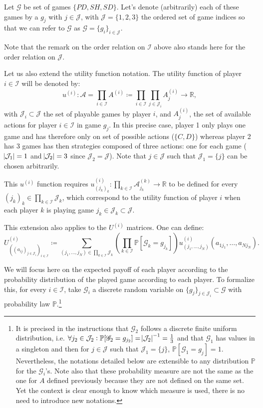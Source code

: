 \documentclass{article}
\renewcommand{\P}{\mathbb P}
\newcommand{\R}{\mathbb R}
\begin{document}
Let $\mathcal G$ be set of games $\{PD, SH, SD\}$. Let's denote (arbitrarily) each of these games by a $g_j$
with $j \in \mathcal J$, with $\mathcal J = \{1, 2, 3\}$ the ordered set of game indices so that we can refer
to $\mathcal G$ as $\mathcal G = \{g_i\}_{i \in \mathcal J}$.

Note that the remark on the order relation on $\mathcal I$ above also stands here for the order relation
on $\mathcal J$.

Let us also extend the utility function notation. The utility function of player $i \in \mathcal I$
will be denoted by:
\[u^{(i)} : \mathcal A = \prod_{i \in \mathcal I}A^{(i)} \coloneqq
	\prod_{i \in \mathcal I}\prod_{j \in \mathcal J_i}A^{(i)}_j \to \R,\]
with $\mathcal J_i \subset \mathcal J$ the set of playable games by player $i$, and $A^{(i)}_j$, the set of
available actions for player $i \in \mathcal I$ in game $g_j$. In this precise case, player 1 only plays
one game and has therefore only on set of possible actions ($\{C, D\}$) whereas player 2 has 3 games has
then strategies composed of three actions: one for each game ($\abs {\mathcal J_1} = 1$ and
$\abs {\mathcal J_2} = 3$ since $\mathcal J_2 = \mathcal J$). Note that $j \in \mathcal J$ such that
$\mathcal J_1 = \{j\}$ can be chosen arbitrarily.

This $u^{(i)}$ function requires $u^{(i)}_{(j_k)_k} : \prod_{k \in \mathcal I}\mathcal A^{(k)}_{j_k} \to \R$
to be defined for every $(j_k)_k \in \prod_{k \in \mathcal I}\mathcal J_k$, which correspond to the
utility function of player $i$ when each player $k$ is playing game $j_k \in \mathcal J_k \subset \mathcal J$.

This extension also applies to the $U^{(i)}$ matrices. One can define:
\[U^{(i)}_{((a_{ij})_{j \in \mathcal J_i})_{i \in \mathcal I}} \coloneqq
	\sum_{(j_1, \ldots, j_N) \in \displaystyle \prod_{k \in \mathcal I} \mathcal J_k}\left(\prod_{k \in \mathcal I}\P[\mathscr G_k = g_{j_k}]\right)
	u^{(i)}_{(j_1, \ldots, j_N)}(a_{1j_1}, \ldots, a_{Nj_N}).\]

We will focus here on the expected payoff of each player according to the probability distribution of
the played game according to each player. To formalize this, for every $i \in \mathcal I$, take
$\mathscr G_i$ a discrete random variable on $\{g_j\}_{j \in \mathcal J_i} \subset \mathcal G$ with
probability law $\P$.\footnote{It is precised in the instructions that $\mathscr G_2$ follows a discrete finite
uniform distribution, i.e. $\forall j_2 \in \mathcal J_2 : \P[\mathscr G_2 = g_{j_2}] = \abs{\mathcal J_2}^{-1} = \frac 13$
and that $\mathscr G_1$ has values in a singleton and then for $j \in \mathcal J$ such that $\mathcal J_1 = \{j\}$,
$\P[\mathscr G_1 = g_j] = 1$.
Nevertheless, the notations detailed below are extensible to any distribution $\P$ for the $\mathscr G_i$'s.
Note also that these probability measure are not the same as the one for $A$ defined previously because
they are not defined on the same set. Yet the context is clear enough to know which measure is used,
there is no need to introduce new notations.}
\end{document}
